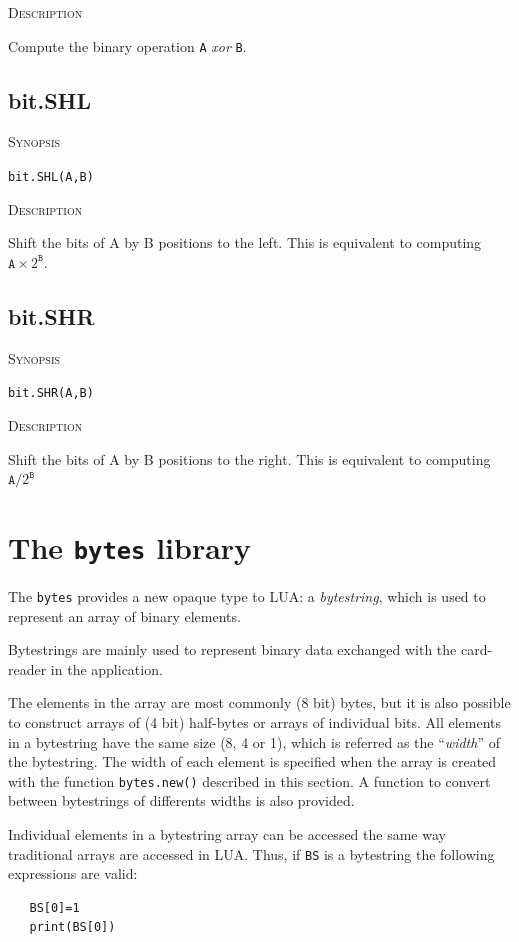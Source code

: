 \documentclass[11pt]{report}
\newcommand{\mansection}[1]{\vspace{0.5em}\par\noindent\textsc{#1}\vspace{0.5em}\par}
\newcommand{\syn}[1]{\texttt{#1}}
\begin{document}
\mansection{Description}
  Compute the binary operation \syn{A} \textit{xor} \syn{B}.

\subsection{bit.SHL}

\mansection{Synopsis}
\syn{bit.SHL(A,B)}

\mansection{Description}
  Shift the bits of A by B positions to the left. 
  This is equivalent to computing $\syn{A}{\times}2^{\syn{B}}$.

\subsection{bit.SHR}

\mansection{Synopsis}
\syn{bit.SHR(A,B)}

\mansection{Description}
  Shift the bits of A by B positions to the right. 
  This is equivalent to computing $\syn{A}/2^{\syn{B}}$

\section{The \syn{bytes} library}

The \syn{bytes} provides a new opaque type to LUA: a \textit{bytestring}, 
which is used to represent an array of binary elements. 

Bytestrings are mainly used to represent binary data exchanged with
the card-reader in the application.

The elements in the array are most commonly (8 bit) bytes, but
it is also possible to construct arrays of (4 bit) half-bytes or
arrays of individual bits. All elements in a bytestring have the same
size (8, 4 or 1), which is referred as the ``\emph{width}'' of the bytestring.
The width of each element is specified when the array is created 
with the function \syn{bytes.new()} described in this section. 
A function to convert between bytestrings of differents widths 
is also provided.

Individual elements in a bytestring array can be accessed the same 
way traditional arrays are accessed in LUA. Thus, if \syn{BS} is
a bytestring the following expressions are valid:

\begin{verbatim}
   BS[0]=1
   print(BS[0])
\end{verbatim} 
\end{document}
